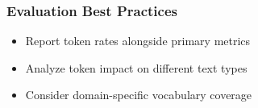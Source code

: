 \subsubsection{Evaluation Best Practices}
\begin{itemize}
\item Report \unk{} token rates alongside primary metrics
\item Analyze \unk{} token impact on different text types
\item Consider domain-specific vocabulary coverage
\end{itemize}





